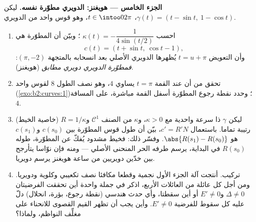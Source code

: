 \begin{problem}
\medskip
\noindent\textbf{الجزء الخامس --- هويغنز: الدويري مطوّرة نفسه.}
ليكن $\gamma(t) = (t - \sin t,\ 1 - \cos t)$، $t \in
\intoo0{2\pi}$، وهو قوس واحد من الدويري.
\begin{enumerate}[resume]
  \item احسب $\kappa(t) = -\dfrac1{4\sin(t/2)}$ ؛ وبيّن أن المطوّرة هي
        \[
        c(t) = (t + \sin t,\ \cos t - 1),
        \]
        وأن التعويض $t = u + \pi$ يُظهرها الدويري الأصلي بعد انسحابه
        بالمتجهة $(\pi, -2)$: \emph{فمطوّرة الدويري دويري مطابق} (هويغنز).
  \item تحقق من أن  عند القمة $t =
        \pi$ يساوي $4$،
        وهو نصف الطول $8$ لقوس واحد (\cref{exo:b2:curves:1})؛ وحدد نقطة رجوع
        المطوّرة أسفل القمة مباشرة، على المسافة $4$.
  \item (خاصية الخيط) ليكن $\gamma$ ذا سرعة واحدية مع $\kappa > 0$، و$\kappa$
        من الصنف $\mathcal C^1$ و$R = 1/\kappa$ رتيبة تماما. باستعمال $c' = R'N$، بيّن
        أن طول قوس المطوّرة بين $c(s_0)$ و$c(s_1)$ هو $\abs{R(s_1) - R(s_0)}$.
        وفسّر ذلك: فخيط مشدود يُفكّ عن المطوّرة، طوله $R(s_0)$ في
        البداية، يرسم طرفه الحر المنحنى الأصلي --- ومنه فإن نوّاسا
        يتأرجح بين خدّين دويريين من ساعة هويغنز يرسم دويريا.
  \item تركيب. أنتجت آلة الجزء الأول نجمية وقطعا مكافئا نصف تكعيبي
        وكلوية ودويريا. ومن أجل كل عائلة من العائلات الأربع، اذكر
        في جملة واحدة أين تحققت الفرضيتان $\Delta \neq 0$ و$E' \neq 0$ أو أين
        سقطتا، وأي حدث هندسي (نقطة رجوع، بؤرة، انحلال) دلّ عليه كل
        سقوط للفرضية $E' \neq 0$. وأين يجب أن تظهر القيم القصوى للانحناء
        على مغلِّف النواظم، ولماذا؟
\end{enumerate}
\end{problem}
